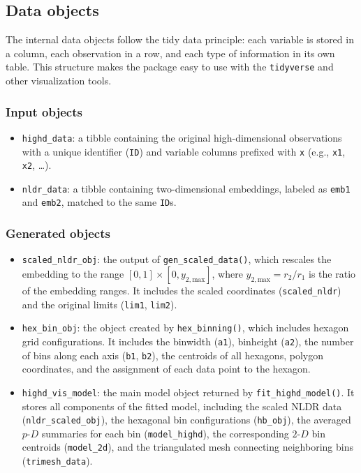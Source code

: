 \subsection{Data objects}\label{data-objects}

The internal data objects follow the tidy data principle: each variable is stored in a column, each observation in a row, and each type of information in its own table. This structure makes the package easy to use with the \texttt{tidyverse} and other visualization tools.

\subsubsection{Input objects}\label{input-objects}

\begin{itemize}
\item
  \texttt{highd\_data}: a tibble containing the original high-dimensional observations with a unique identifier (\texttt{ID}) and variable columns prefixed with \texttt{x} (e.g., \texttt{x1}, \texttt{x2}, \ldots).
\item
  \texttt{nldr\_data}: a tibble containing two-dimensional embeddings, labeled as \texttt{emb1} and \texttt{emb2}, matched to the same \texttt{ID}s.
\end{itemize}

\subsubsection{Generated objects}\label{generated-objects}

\begin{itemize}
\item
  \texttt{scaled\_nldr\_obj}: the output of \texttt{gen\_scaled\_data()}, which rescales the embedding to the range \([0, 1] \times [0, y_{2,\text{max}}]\), where \(y_{2,\text{max}} = r_2 / r_1\) is the ratio of the embedding ranges. It includes the scaled coordinates (\texttt{scaled\_nldr}) and the original limits (\texttt{lim1}, \texttt{lim2}).
\item
  \texttt{hex\_bin\_obj}: the object created by \texttt{hex\_binning()}, which includes hexagon grid configurations. It includes the binwidth (\texttt{a1}), binheight (\texttt{a2}), the number of bins along each axis (\texttt{b1}, \texttt{b2}), the centroids of all hexagons, polygon coordinates, and the assignment of each data point to the hexagon.
\item
  \texttt{highd\_vis\_model}: the main model object returned by \texttt{fit\_highd\_model()}. It stores all components of the fitted model, including the scaled NLDR data (\texttt{nldr\_scaled\_obj}), the hexagonal bin configurations (\texttt{hb\_obj}), the averaged \(p\text{-}D\) summaries for each bin (\texttt{model\_highd}), the corresponding \(2\text{-}D\) bin centroids (\texttt{model\_2d}), and the triangulated mesh connecting neighboring bins (\texttt{trimesh\_data}).
\end{itemize}

